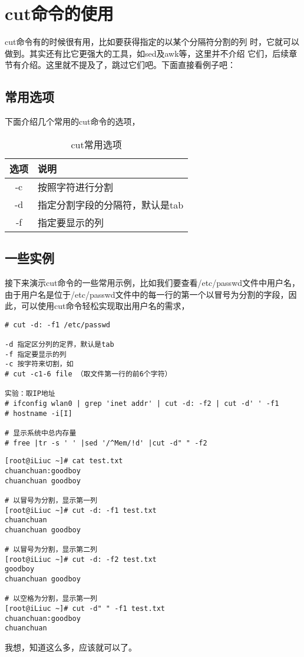 \section{cut命令的使用}
\label{sec:cutCmd}

cut命令有的时候很有用，比如要获得指定的以某个分隔符分割的列
时，它就可以做到。其实还有比它更强大的工具，如sed及awk等，这里并不介绍
它们，后续章节有介绍。这里就不提及了，跳过它们吧。下面直接看例子吧：

\subsection{常用选项}
\label{subsec:cutOptions}

下面介绍几个常用的cut命令的选项，

\begin{table}[htbp]
  \centering
    \caption{cut常用选项}
    \label{tab:cutSomeOpts}
    \begin{tabular}{cl}
      \toprule
      选项     & 说明 \\
      \midrule
      -c        & 按照字符进行分割 \\
      -d        & 指定分割字段的分隔符，默认是tab \\
      -f        & 指定要显示的列 \\
      \bottomrule
    \end{tabular}
\end{table}

\subsection{一些实例}
\label{subsec:cutInstances}

接下来演示cut命令的一些常用示例，比如我们要查看/etc/passwd文件中用户名，由于用户名是位于/etc/passwd文件中的每一行的第一个以冒号为分割的字段，因此，可以使用cut命令轻松实现取出用户名的需求，

\begin{verbatim}
# cut -d: -f1 /etc/passwd

-d 指定区分列的定界，默认是tab
-f 指定要显示的列
-c 按字符来切割，如
# cut -c1-6 file （取文件第一行的前6个字符）

实验：取IP地址
# ifconfig wlan0 | grep 'inet addr' | cut -d: -f2 | cut -d' ' -f1
# hostname -i[I]

# 显示系统中总内存量
# free |tr -s ' ' |sed '/^Mem/!d' |cut -d" " -f2
\end{verbatim}


\begin{verbatim}
[root@iLiuc ~]# cat test.txt
chuanchuan:goodboy
chuanchuan goodboy

# 以冒号为分割，显示第一列
[root@iLiuc ~]# cut -d: -f1 test.txt
chuanchuan
chuanchuan goodboy

# 以冒号为分割，显示第二列
[root@iLiuc ~]# cut -d: -f2 test.txt
goodboy
chuanchuan goodboy

# 以空格为分割，显示第一列
[root@iLiuc ~]# cut -d" " -f1 test.txt
chuanchuan:goodboy
chuanchuan
\end{verbatim}

我想，知道这么多，应该就可以了。
